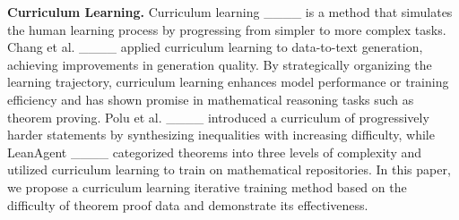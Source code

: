 \textbf{Curriculum Learning.} %
Curriculum learning ____ 
is a method that simulates the human learning process by progressing from simpler to more complex tasks. 
Chang et al. ____ applied curriculum learning to data-to-text generation, achieving improvements in generation quality. %
By strategically organizing the learning trajectory, curriculum learning enhances model performance or training efficiency and has shown promise in mathematical reasoning tasks such as theorem proving. %
Polu et al. ____ introduced a curriculum of progressively harder statements by synthesizing inequalities with increasing difficulty, 
while LeanAgent ____ categorized theorems into three levels of complexity and utilized curriculum learning to train on mathematical repositories. 
In this paper, we propose a curriculum learning iterative training method based on the difficulty of theorem proof data and demonstrate its effectiveness.


